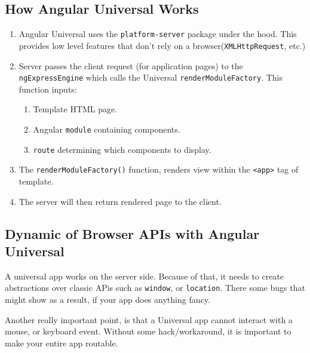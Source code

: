 \subsection{How Angular Universal Works}
\begin{enumerate}
  \item Angular Universal uses the \lstinline{platform-server} package under the hood. This provides low level features that don't rely on a browser(\lstinline{XMLHttpRequest}, etc.)
  \item Server passes the client request (for application pages) to the \lstinline{ngExpressEngine} which calls the Universal \lstinline{renderModuleFactory}. This function inputs: 
  \begin{enumerate}
    \item Template HTML page.
    \item Angular \lstinline{module} containing components.
    \item \lstinline{route} determining which components to display. 
  \end{enumerate}
  \item The \lstinline{renderModuleFactory()} function, renders view within the \lstinline{<app>} tag of template. 
  \item The server will then return rendered page to the client. 
\end{enumerate}

\subsection{Dynamic of Browser APIs with Angular Universal}
A universal app works on the server side. Because of that, it needs to create abstractions over classic APis such as \lstinline{window}, or \lstinline{location}. There some bugs that might show as a result, if your app does anything fancy. 

Another really important point, is that a Universal app cannot interact with a mouse, or keyboard event. Without some hack/workaround, it is important to make your entire app routable. 
